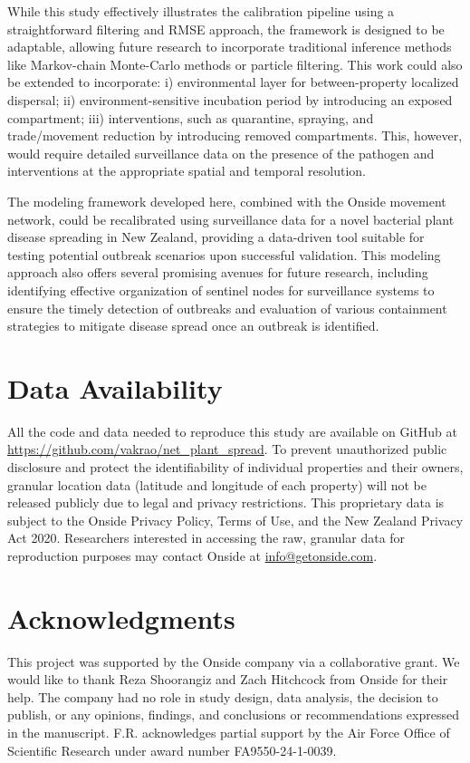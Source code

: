 \documentclass[aps,physrev,reprint,superscriptaddress]{revtex4-1}
\begin{document}
While this study effectively illustrates the calibration pipeline using a straightforward filtering and RMSE  approach, the framework is designed to be adaptable, allowing future research to incorporate traditional inference methods like Markov-chain Monte-Carlo methods \cite{chowell2017fitting} or particle filtering\cite{yang2014comparison}. This work could also be extended to incorporate:  i) environmental layer for between-property localized dispersal; ii) environment-sensitive incubation period by introducing an exposed compartment; iii) interventions, such as quarantine, spraying, and trade/movement reduction by introducing removed compartments. This, however, would require detailed surveillance data on the presence of the pathogen and interventions at the appropriate spatial and temporal resolution. 

The modeling framework developed here, combined with the Onside movement network, could be recalibrated using surveillance data for a novel bacterial plant disease spreading in New Zealand, providing a data-driven tool suitable for testing potential outbreak scenarios upon successful validation. This modeling approach also offers several promising avenues for future research, including identifying effective organization of sentinel nodes for surveillance systems \cite{bajardi2012optimizing,colman2019efficient} to ensure the timely detection of outbreaks and evaluation of various containment strategies to mitigate disease spread once an outbreak is identified. 


\section{Data Availability}
All the code and data needed to reproduce this study are available on GitHub at \url{https://github.com/vakrao/net_plant_spread}. To prevent unauthorized public disclosure and protect the identifiability of individual properties and their owners, granular location data (latitude and longitude of each property) will not be released publicly due to legal and privacy restrictions. This proprietary data is subject to the Onside Privacy Policy, Terms of Use, and the New Zealand Privacy Act 2020. Researchers interested in accessing the raw, granular data for reproduction purposes may contact Onside at \url{info@getonside.com}.    

\section{Acknowledgments}
This project was supported by the Onside company via a collaborative grant. We would like to thank Reza Shoorangiz and Zach Hitchcock from Onside for their help. The company had no role in study design, data analysis, the decision to publish, or any opinions, findings, and conclusions or recommendations expressed in the manuscript. F.R. acknowledges partial support by the Air Force Office of Scientific Research under award number FA9550-24-1-0039.

\end{document}
